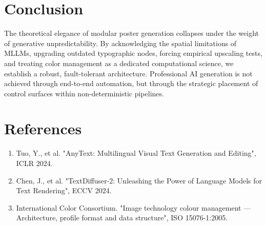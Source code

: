 \documentclass[10pt,journal,compsoc]{IEEEtran}
\begin{document}
\section{Conclusion}
The theoretical elegance of modular poster generation collapses under the weight of generative unpredictability. By acknowledging the spatial limitations of MLLMs, upgrading outdated typographic nodes, forcing empirical upscaling tests, and treating color management as a dedicated computational science, we establish a robust, fault-tolerant architecture. Professional AI generation is not achieved through end-to-end automation, but through the strategic placement of control surfaces within non-deterministic pipelines.

\section*{References}
\begin{enumerate}
    \item Tuo, Y., et al. "AnyText: Multilingual Visual Text Generation and Editing", ICLR 2024.
    \item Chen, J., et al. "TextDiffuser-2: Unleashing the Power of Language Models for Text Rendering", ECCV 2024.
    \item International Color Consortium. "Image technology colour management — Architecture, profile format and data structure", ISO 15076-1:2005.
\end{enumerate}
\end{document}
